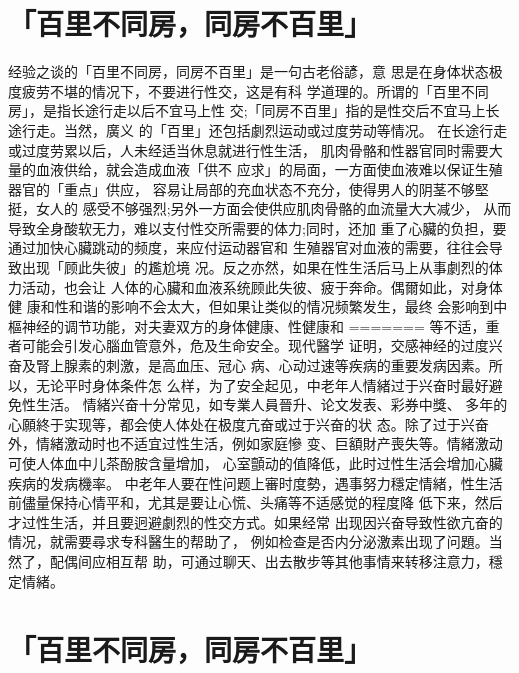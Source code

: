 \documentclass[12pt,UTF8]{ctexbook}
\begin{document}
\section{「百里不同房，同房不百里」}

经验之谈的「百里不同房，同房不百里」是一句古老俗諺，意
思是在身体状态极度疲劳不堪的情况下，不要进行性交，这是有科
学道理的。所谓的「百里不同房」，是指长途行走以后不宜马上性
交;「同房不百里」指的是性交后不宜马上长途行走。当然，廣义
的「百里」还包括劇烈运动或过度劳动等情况。
在长途行走或过度劳累以后，人未经适当休息就进行性生活，
肌肉骨骼和性器官同时需要大量的血液供给，就会造成血液「供不
应求」的局面，一方面使血液难以保证生殖器官的「重点」供应，
容易让局部的充血状态不充分，使得男人的阴茎不够堅挺，女人的
感受不够强烈;另外一方面会使供应肌肉骨骼的血流量大大减少，
从而导致全身酸软无力，难以支付性交所需要的体力;同时，还加
重了心臟的负担，要通过加快心臟跳动的频度，来应付运动器官和
生殖器官对血液的需要，往往会导致出现「顾此失彼」的尷尬境
况。反之亦然，如果在性生活后马上从事劇烈的体力活动，也会让
人体的心臟和血液系统顾此失彼、疲于奔命。偶爾如此，对身体健
康和性和谐的影响不会太大，但如果让类似的情况频繁发生，最终
会影响到中樞神经的调节功能，对夫妻双方的身体健康、性健康和
=======
等不适，重者可能会引发心腦血管意外，危及生命安全。现代醫学
证明，交感神经的过度兴奋及腎上腺素的刺激，是高血压、冠心
病、心动过速等疾病的重要发病因素。所以，无论平时身体条件怎
么样，为了安全起见，中老年人情緒过于兴奋时最好避免性生活。
情緒兴奋十分常见，如专業人員晉升、论文发表、彩券中獎、
多年的心願終于实现等，都会使人体处在极度亢奋或过于兴奋的状
态。除了过于兴奋外，情緒激动时也不适宜过性生活，例如家庭慘
变、巨額財产喪失等。情緒激动可使人体血中儿茶酚胺含量增加，
心室顫动的值降低，此时过性生活会增加心臟疾病的发病機率。
中老年人要在性问题上審时度勢，遇事努力穩定情緒，性生活
前儘量保持心情平和，尤其是要让心慌、头痛等不适感觉的程度降
低下来，然后才过性生活，并且要迥避劇烈的性交方式。如果经常
出现因兴奋导致性欲亢奋的情况，就需要尋求专科醫生的帮助了，
例如检查是否内分泌激素出现了问題。当然了，配偶间应相互帮
助，可通过聊天、出去散步等其他事情来转移注意力，穩定情緒。

\section{「百里不同房，同房不百里」}
\end{document}
